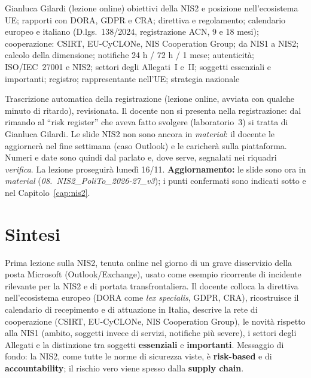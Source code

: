   {Gianluca Gilardi (lezione online)}
  {obiettivi della NIS2 e posizione nell'ecosistema UE; rapporti con DORA, GDPR e CRA; direttiva e
   regolamento; calendario europeo e italiano (D.lgs.~138/2024, registrazione ACN, 9 e 18 mesi);
   cooperazione: CSIRT, EU-CyCLONe, NIS Cooperation Group; da NIS1 a NIS2; calcolo della dimensione;
   notifiche 24 h / 72 h / 1 mese; autenticità; ISO/IEC~27001 e NIS2; settori degli Allegati~I e~II;
   soggetti essenziali e importanti; registro; rappresentante nell'UE; strategia nazionale}
\label{lez:2026-11-13}

\begin{nota}[Fonte]
Trascrizione automatica della registrazione (lezione online, avviata con qualche minuto di ritardo),
revisionata. Il docente non si presenta nella registrazione: dal rimando al ``risk register'' che
aveva fatto svolgere (laboratorio~3) si tratta di Gianluca Gilardi. Le slide NIS2 non sono ancora in
\emph{material}: il docente le aggiornerà nel fine settimana (caso Outlook) e le caricherà sulla
piattaforma. Numeri e date sono quindi dal parlato e, dove serve, segnalati nei riquadri
\emph{verifica}. La lezione proseguirà lunedì 16/11. \textbf{Aggiornamento:} le slide sono ora in
\emph{material} (\emph{08.~NIS2\_PoliTo\_2026-27\_v3}); i punti confermati sono indicati sotto e nel
Capitolo~\ref{cap:nis2}.
\end{nota}

\section{Sintesi}
Prima lezione sulla NIS2, tenuta online nel giorno di un grave disservizio della posta Microsoft
(Outlook/Exchange), usato come esempio ricorrente di incidente rilevante per la NIS2 e di portata
transfrontaliera. Il docente colloca la direttiva nell'ecosistema europeo (DORA come \emph{lex
specialis}, GDPR, CRA), ricostruisce il calendario di recepimento e di attuazione in Italia, descrive
la rete di cooperazione (CSIRT, EU-CyCLONe, NIS Cooperation Group), le novità rispetto alla NIS1
(ambito, soggetti invece di servizi, notifiche più severe), i settori degli Allegati e la distinzione
tra soggetti \textbf{essenziali} e \textbf{importanti}. Messaggio di fondo: la NIS2, come tutte le
norme di sicurezza viste, è \textbf{risk-based} e di \textbf{accountability}; il rischio vero viene
spesso dalla \textbf{supply chain}.


